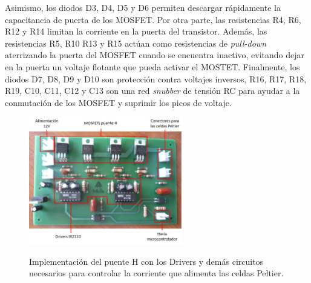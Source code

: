 Asimismo, los diodos D3, D4, D5 y D6 permiten descargar rápidamente la  capacitancia de puerta de los MOSFET. Por otra parte, las resistencias R4, R6, R12 y R14 limitan la corriente en la puerta del transistor. Además, las resistencias R5, R10 R13 y R15 actúan como resistencias de \textit{pull-down} aterrizando la puerta del MOSFET cuando se encuentra inactivo, evitando dejar en la puerta un voltaje flotante que pueda activar el MOSTET. Finalmente, los diodos D7, D8, D9 y D10 son protección contra voltajes inversos, R16, R17, R18, R19, C10, C11, C12 y C13 son  una red \textit{snubber} de tensión RC para ayudar a la conmutación de los MOSFET y suprimir los picos de voltaje. 
\begin{figure}[h!]
\begin{centering}
  \caption{Implementación del puente H con los Drivers y demás circuitos necesarios para controlar la corriente que alimenta las celdas Peltier.}
  \includegraphics[width=0.6\textwidth]{Images/Tarjeta.jpg}
  \label{fig:PCB}
  \par\end{centering}
\end{figure}
